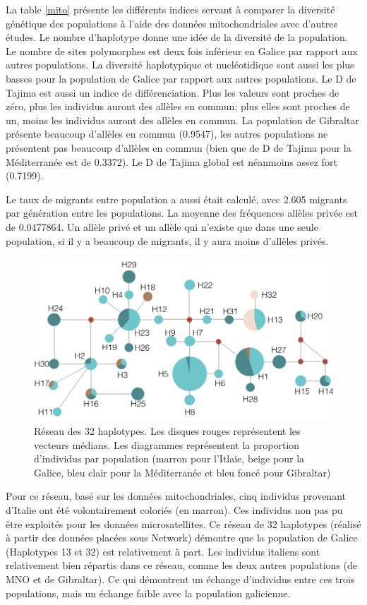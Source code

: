 \documentclass[a4paper,12pt,twoside]{article}\usepackage[]{graphicx}\usepackage[]{color}
\begin{document}
La table \ref{mito} présente les différents indices servant à comparer la diversité génétique des populations à l'aide des données mitochondriales avec d'autres études. Le nombre d'haplotype donne une idée de la diversité de la population. Le nombre de sites polymorphes est deux fois inférieur en Galice par rapport aux autres populations. La diversité haplotypique et nucléotidique sont aussi les plus basses pour la population de Galice par rapport aux autres populations. Le D de Tajima est aussi un indice de différenciation. Plus les valeurs sont proches de zéro, plus les individus auront des allèles en commun; plus elles sont proches de un, moins les individus auront des allèles en commun. La population de Gibraltar présente beaucoup d'allèles en commun (0.9547), les autres populations ne présentent pas beaucoup d'allèles en commun (bien que de D de Tajima pour la Méditerranée est de 0.3372). Le D de Tajima global est néanmoins assez fort (0.7199).

Le taux de migrants entre population a aussi était calculé, avec 2.605 migrants par génération entre les populations. La moyenne des fréquences allèles privée est de 0.0477864. Un allèle privé et un allèle qui n'existe que dans une seule population, si il y a beaucoup de migrants, il y aura moins d'allèles privés.

\begin{figure}[h]
   \centering\includegraphics[scale=0.4]{reseau}
   \caption[Réseau d'haplotypes.]{Réseau des 32 haplotypes. Les disques rouges représentent les vecteurs médians. Les diagrammes représentent la proportion d'individus par population (marron pour l'Itlaie, beige pour la Galice, bleu clair pour la Méditerranée et bleu foncé pour Gibraltar)}
\end{figure}
\FloatBarrier

Pour ce réseau, basé sur les données mitochondriales, cinq individus provenant d'Italie ont été volontairement coloriés (en marron). Ces individus non pas pu être exploités pour les données microsatellites.
Ce réseau de 32 haplotypes (réalisé à partir des données placées sous Network) démontre que la population de Galice (Haplotypes 13 et 32) est relativement à part. Les individus italiens sont relativement bien répartis dans ce réseau, comme les deux autres populations (de MNO et de Gibraltar). Ce qui démontrent un échange d'individus entre ces trois populations, mais un échange faible avec la population galicienne.
\end{document}
